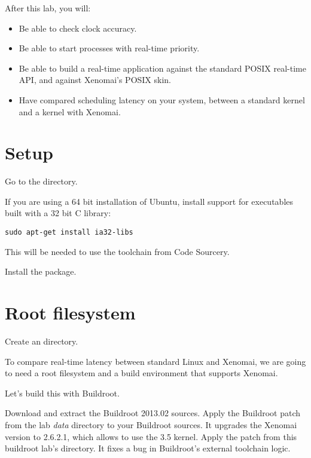 
After this lab, you will:
\begin{itemize}
\item Be able to check clock accuracy.
\item Be able to start processes with real-time priority.
\item Be able to build a real-time application against the standard
POSIX real-time API, and against Xenomai's POSIX skin.
\item Have compared scheduling latency on your system, between a standard kernel and a kernel with Xenomai.
\end{itemize}

\section{Setup}

Go to the  directory.

If you are using a 64 bit installation of Ubuntu, install support for
executables built with a 32 bit C library:

\begin{verbatim}
sudo apt-get install ia32-libs
\end{verbatim}

This will be needed to use the toolchain from Code Sourcery.

Install the  package.

\section{Root filesystem}

Create an  directory.

To compare real-time latency between standard Linux and Xenomai, we
are going to need a root filesystem and a build environment that
supports Xenomai.

Let's build this with Buildroot.

Download and extract the Buildroot 2013.02 sources. Apply the
Buildroot patch 
from the lab {\em data} directory to your Buildroot sources. It
upgrades the Xenomai version to 2.6.2.1, which allows to use the 3.5
kernel. Apply the
patch from this buildroot lab's  directory. It fixes a bug
in Buildroot's external toolchain logic.


